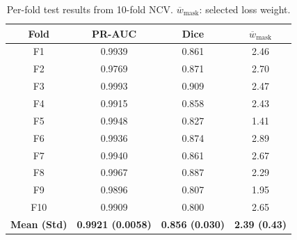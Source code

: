 \begin{table}[!t]
  \centering
  \caption{Per-fold test results from 10-fold NCV.
           $\overline{w}_{\text{mask}}$: selected loss weight.}
  \label{tab:nested_cv}
  \begin{tabular}{cccc}
    \toprule
    Fold & PR-AUC & Dice & $\overline{w}_{\text{mask}}$ \\
    \midrule
    F1  & 0.9939 & 0.861 & 2.46 \\
    F2  & 0.9769 & 0.871 & 2.70 \\
    F3  & 0.9993 & 0.909 & 2.47 \\
    F4  & 0.9915 & 0.858 & 2.43 \\
    F5  & 0.9948 & 0.827 & 1.41 \\
    F6  & 0.9936 & 0.874 & 2.89 \\
    F7  & 0.9940 & 0.861 & 2.67 \\
    F8  & 0.9967 & 0.887 & 2.29 \\
    F9  & 0.9896 & 0.807 & 1.95 \\
    F10 & 0.9909 & 0.800 & 2.65 \\
    \midrule
    \textbf{Mean (Std)} & \textbf{0.9921 (0.0058)} & \textbf{0.856 (0.030)} & \textbf{2.39 (0.43)} \\
    \bottomrule
  \end{tabular}
\end{table}

